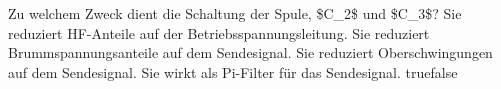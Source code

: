     {Zu welchem Zweck dient die Schaltung der Spule, \$C\_2\$ und \$C\_3\$?}
    {Sie reduziert HF-Anteile auf der Betriebsspannungsleitung.}
    {Sie reduziert Brummspannungsanteile auf dem Sendesignal.}
    {Sie reduziert Oberschwingungen auf dem Sendesignal.}
    {Sie wirkt als Pi-Filter für das Sendesignal.}
    {true}{false}